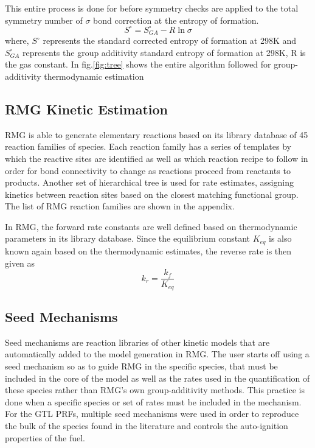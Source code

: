  This entire process is done for before symmetry checks are applied to the total symmetry number of $\sigma$ bond correction at the entropy of formation.
\begin{equation}
    S^{\circ}=S_{GA}^{\circ}-R\ln\sigma
\end{equation} 
where, $S^{\circ}$ represents the standard corrected entropy of formation at 298K and $S_{GA}^{\circ}$ represents the group additivity standard entropy of formation at 298K, R is the gas constant. In fig.\ref{fig:tree} shows the entire algorithm followed for group-additivity thermodynamic estimation
 
 
 
 
 \subsection{RMG Kinetic Estimation}
 RMG is able to generate elementary reactions based on its library database of 45 reaction families of species. Each reaction family has a series of templates by which the reactive sites are identified as well as which reaction recipe to follow in order for bond connectivity to change as reactions proceed from reactants to products. Another set of hierarchical tree is used for rate estimates, assigning kinetics between reaction sites based on the closest matching functional group. The list of RMG reaction families are shown in the appendix.
%  
 
 
 
 
 In RMG, the forward rate constants are well defined based on thermodynamic parameters in its library database. Since the equilibrium constant $K_{eq}$ is also known again based on the thermodynamic estimates, the reverse rate is then given as \begin{equation}
     k_r=\frac{k_f}{K_{eq}}
 \end{equation}


\subsection{Seed Mechanisms}
Seed mechanisms are reaction libraries of other kinetic models that are automatically added to the model generation in RMG. The user starts off using a seed mechanism so as to guide RMG in the specific species, that must be included in the core of the model as well as the rates used in the quantification of these species rather than RMG's own group-additivity methods. This practice is done when a specific species or set of rates must be included in the mechanism. For the GTL PRFs, multiple seed mechanisms were used in order to reproduce the bulk of the species found in the literature and controls the auto-ignition properties of the fuel.


